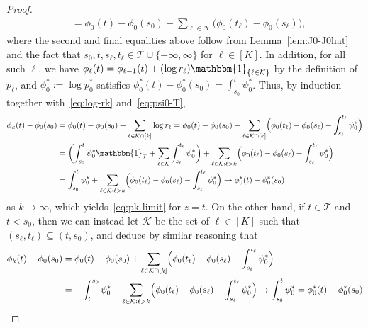 \documentclass[a4paper]{article}
\newcommand{\Ind}{\mathbbm{1}}
\theoremstyle{definition}
\begin{document}
\begin{proof}
\begin{align}
\label{eq:psi0-T}
&= \phi_0(t) - \phi_0(s_0) - \sum_{\ell \in \mathcal{K}}\bigl(\phi_0(t_\ell) - \phi_0(s_\ell)\bigr),
\end{align}
where the second and final equalities above follow from Lemma~\ref{lem:J0-J0hat} and the fact that $s_0,t,s_\ell,t_\ell \in \mathcal{T} \cup \{-\infty,\infty\}$ for $\ell \in [K]$. In addition, for all such $\ell$, we have $\phi_\ell(t) = \phi_{\ell-1}(t) + (\log r_\ell)\Ind_{\{\ell \in \mathcal{K}\}}$ by the definition of $p_\ell$, and $\phi_0^* := \log p_0^*$ satisfies $\phi_0^*(t) - \phi_0^*(s_0) = \int_{s_0}^t \psi_0^*$. Thus, by induction together with~\eqref{eq:log-rk} and~\eqref{eq:psi0-T},
\begin{align*}
\phi_k(t) - \phi_0(s_0) &= \phi_0(t) - \phi_0(s_0) + \sum_{\ell \in \mathcal{K} \cap [k]}\log r_\ell = \phi_0(t) - \phi_0(s_0) - \sum_{\ell \in \mathcal{K} \cap [k]} \Bigl(\phi_0(t_\ell) - \phi_0(s_\ell) - \int_{s_\ell}^{t_\ell}\psi_0^*\Bigr) \\
&= \biggl(\int_{s_0}^t \psi_0^* \Ind_{\mathcal{T}} + \sum_{\ell \in \mathcal{K}} \int_{s_\ell}^{t_\ell} \psi_0^*\biggr) + \sum_{\ell \in \mathcal{K} : \ell > k} \Bigl(\phi_0(t_\ell) - \phi_0(s_\ell) - \int_{s_\ell}^{t_\ell}\psi_0^*\Bigr) \\
&= \int_{s_0}^t \psi_0^* + \sum_{\ell \in \mathcal{K} : \ell > k} \Bigl(\phi_0(t_\ell) - \phi_0(s_\ell) - \int_{s_\ell}^{t_\ell}\psi_0^*\Bigr) \to \phi_0^*(t) - \phi_0^*(s_0)
\end{align*}
as $k \to \infty$, which yields~\eqref{eq:pk-limit} for $z = t$. On the other hand, if $t \in \mathcal{T}$ and $t < s_0$, then we can instead let $\mathcal{K}$ be the set of $\ell \in [K]$ such that $(s_\ell,t_\ell) \subseteq (t,s_0)$, and deduce by similar reasoning that
\begin{align*}
\phi_k(t) - \phi_0(s_0) &= \phi_0(t) - \phi_0(s_0) + \sum_{\ell \in \mathcal{K} \cap [k]} \Bigl(\phi_0(t_\ell) - \phi_0(s_\ell) - \int_{s_\ell}^{t_\ell}\psi_0^*\Bigr) \\
&= -\int_t^{s_0}\psi_0^* - \sum_{\ell \in \mathcal{K} : \ell > k} \Bigl(\phi_0(t_\ell) - \phi_0(s_\ell) - \int_{s_\ell}^{t_\ell}\psi_0^*\Bigr) \to \int_{s_0}^t \psi_0^* = \phi_0^*(t) - \phi_0^*(s_0)

\end{align*}
\end{proof}
\end{document}
